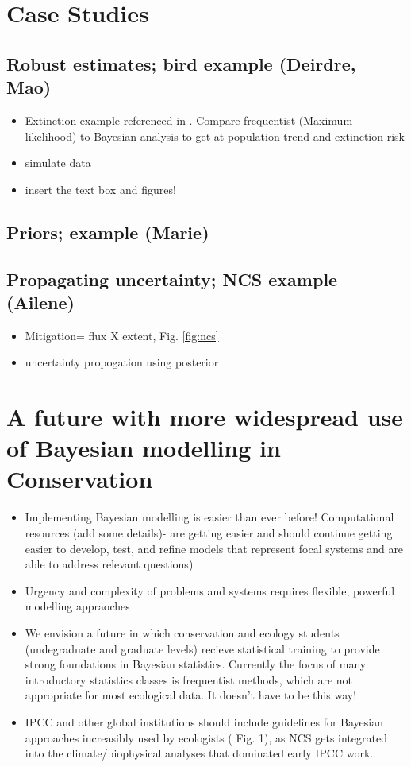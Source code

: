 \documentclass{article}
\begin{document}
\section* {Case Studies}
\subsection*{Robust estimates; bird example (Deirdre, Mao)}
\begin{itemize}

\item Extinction example referenced in \citep{wade2000bayesian}. Compare frequentist (Maximum likelihood) to Bayesian analysis to get at population trend and extinction risk 
\item simulate data
\item insert the text box and figures!
\end{itemize}

\subsection*{Priors; example (Marie)}

\subsection*{Propagating uncertainty; NCS example (Ailene)}
\begin{itemize}
\item Mitigation= flux X extent, Fig. \ref{fig:ncs}
\item uncertainty propogation using posterior
\end{itemize}

\section* {A future with more widespread use of Bayesian modelling in Conservation}
\begin{itemize}
\item Implementing Bayesian modelling is easier than ever before! Computational resources (add some details)- are getting easier and should continue getting easier to develop, test, and refine models that represent focal systems and are able to address relevant questions)
\item Urgency and complexity of problems and systems requires flexible, powerful modelling appraoches 
\item We envision a future in which conservation and ecology students (undegraduate and graduate levels) recieve statistical training to provide strong foundations in Bayesian statistics. Currently the focus of many introductory statistics classes is frequentist methods, which are not appropriate for most ecological data. It doesn't have to be this way! 
\item IPCC and other global institutions should include guidelines for Bayesian approaches increasibly used by ecologists ( Fig. 1), as NCS gets integrated into the climate/biophysical analyses that dominated early IPCC work.
\end{itemize}
\end{document}
